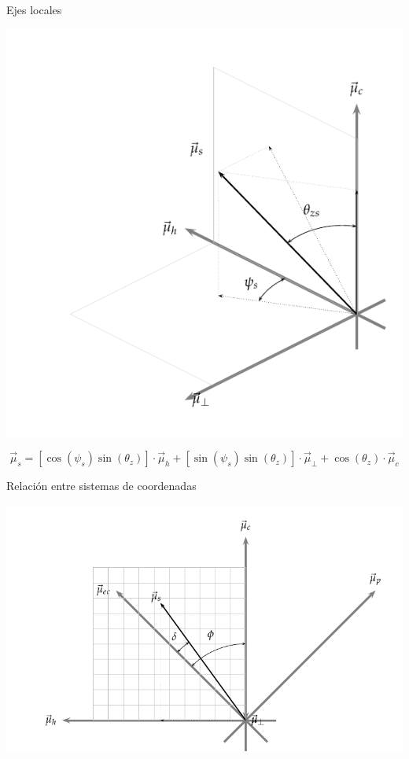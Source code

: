 \documentclass[xcolor={usenames,svgnames,dvipsnames}]{beamer}
\begin{document}
\begin{frame}[label={sec:org13e4ccb}]{Ejes locales}
\begin{center}
\includegraphics[width=.9\linewidth]{../figs/SistemaCoordenadasLocal.pdf}
\end{center}

\[\vec{\mu}_{s}=\left[\cos\left(\psi_{s}\right)\sin\left(\theta_{z}\right)\right]\cdot\vec{\mu}_{h}+\left[\sin\left(\psi_{s}\right)\sin\left(\theta_{z}\right)\right]\cdot\vec{\mu}_{\bot}+\cos\left(\theta_{z}\right)\cdot\vec{\mu}_{c}\]
\end{frame}

\begin{frame}[label={sec:orga122a4f}]{Relación entre sistemas de coordenadas}
\begin{center}
\includegraphics[width=.9\linewidth]{../figs/RelacionSistemasCoordenadas.pdf}
\end{center}
\end{frame}
\end{document}
